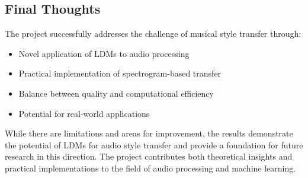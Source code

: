 \subsection{Final Thoughts}
The project successfully addresses the challenge of musical style transfer through:
\begin{itemize}
    \item Novel application of LDMs to audio processing
    \item Practical implementation of spectrogram-based transfer
    \item Balance between quality and computational efficiency
    \item Potential for real-world applications
\end{itemize}

While there are limitations and areas for improvement, the results demonstrate the potential of LDMs for audio style transfer and provide a foundation for future research in this direction. The project contributes both theoretical insights and practical implementations to the field of audio processing and machine learning. 